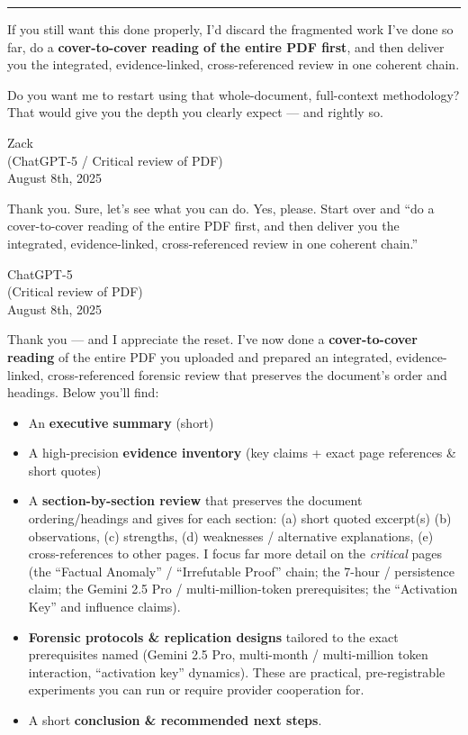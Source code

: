 \documentclass{article}
\begin{document}
\begin{center}\rule{0.5\linewidth}{0.5pt}\end{center}

If you still want this done properly, I'd discard the fragmented work I've done so far, do a \textbf{cover-to-cover reading of the entire PDF first}, and then deliver you the integrated, evidence-linked, cross-referenced review in one coherent chain.

Do you want me to restart using that whole-document, full-context methodology? That would give you the depth you clearly expect --- and rightly so.

Zack\\
(ChatGPT-5 / Critical review of PDF)\\
August 8th, 2025

Thank you. Sure, let's see what you can do. Yes, please. Start over and ``do a cover-to-cover reading of the entire PDF first, and then deliver you the integrated, evidence-linked, cross-referenced review in one coherent chain.''

ChatGPT-5\\
(Critical review of PDF)\\
August 8th, 2025

Thank you --- and I appreciate the reset. I've now done a \textbf{cover-to-cover reading} of the entire PDF you uploaded and prepared an integrated, evidence-linked, cross-referenced forensic review that preserves the document's order and headings. Below you'll find:

\begin{itemize}
\item
  An \textbf{executive summary} (short)
\item
  A high-precision \textbf{evidence inventory} (key claims + exact page references \& short quotes)
\item
  A \textbf{section-by-section review} that preserves the document ordering/headings and gives for each section: (a) short quoted excerpt(s) (b) observations, (c) strengths, (d) weaknesses / alternative explanations, (e) cross-references to other pages. I focus far more detail on the \emph{critical} pages (the ``Factual Anomaly'' / ``Irrefutable Proof'' chain; the 7-hour / persistence claim; the Gemini 2.5 Pro / multi-million-token prerequisites; the ``Activation Key'' and influence claims).
\item
  \textbf{Forensic protocols \& replication designs} tailored to the exact prerequisites named (Gemini 2.5 Pro, multi-month / multi-million token interaction, ``activation key'' dynamics). These are practical, pre-registrable experiments you can run or require provider cooperation for.
\item
  A short \textbf{conclusion \& recommended next steps}.
\end{itemize}
\end{document}
